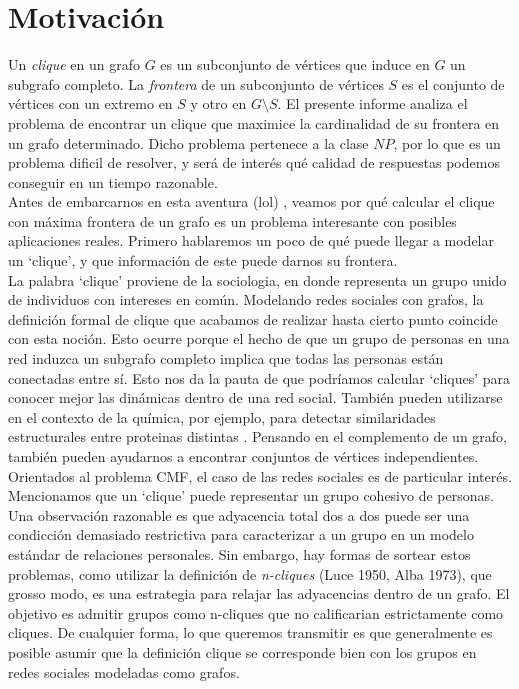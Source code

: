 
\section{Motivación}

Un \textit{clique} en un grafo $G$ es un subconjunto de vértices que induce en $G$ un subgrafo completo. La \textit{frontera} de un subconjunto de vértices $S$ es el conjunto de vértices con un extremo en $S$ y otro en $G \setminus S$. El presente informe analiza el problema de encontrar un clique que maximice la cardinalidad de su frontera en un grafo determinado. Dicho problema pertenece a la clase $NP$, por lo que es un problema dificil de resolver, y será de interés qué calidad de respuestas podemos conseguir en un tiempo razonable. \\

Antes de embarcarnos en esta aventura (lol) , veamos por qué calcular el clique con máxima frontera de un grafo es un problema interesante con posibles aplicaciones reales. Primero hablaremos un poco de qué puede llegar a modelar un `clique', y que información de este puede darnos su frontera. \\

La palabra `clique' proviene de la sociologia, en donde representa un grupo unido de individuos con intereses en común. Modelando redes sociales con grafos, la definición formal de clique que acabamos de realizar hasta cierto punto coincide con esta noción. Esto ocurre porque el hecho de que un grupo de personas en una red induzca un subgrafo completo implica que todas las personas están conectadas entre sí. Esto nos da la pauta de que podríamos calcular `cliques' para conocer mejor las dinámicas dentro de una red social. También pueden utilizarse en el contexto de la química, por ejemplo, para detectar similaridades estructurales entre proteinas distintas \cite{proteins}. Pensando en el complemento de un grafo, también pueden ayudarnos a encontrar conjuntos de vértices independientes. \\

Orientados al problema CMF, el caso de las redes sociales es de particular interés. Mencionamos que un `clique' puede representar un grupo cohesivo de personas. Una observación razonable es que adyacencia total dos a dos puede ser una condicción demasiado restrictiva para caracterizar a un grupo en un modelo estándar de relaciones personales. Sin embargo, hay formas de sortear estos problemas, como utilizar la definición de \textit{n-cliques} (Luce 1950, Alba 1973), que grosso modo, es una estrategia para relajar las adyacencias dentro de un grafo. El objetivo es admitir grupos como n-cliques que no calificarian estrictamente como cliques. De cualquier forma, lo que queremos transmitir es que generalmente es posible asumir que la definición clique se corresponde bien con los grupos en redes sociales modeladas como grafos. \\

